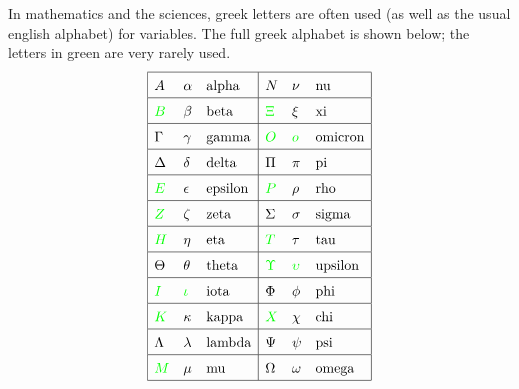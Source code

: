 \documentclass[a4paper]{book}
\newcommand{\GREEN}[1]{{\color{green}#1}}
\renewcommand{\:}{\colon}
\theoremstyle{definition}
\begin{document}
In mathematics and the sciences, greek letters are often used (as well
as the usual english alphabet) for variables.  The full greek alphabet
is shown below; the letters in green are very rarely used.
\[ \renewcommand{\arraystretch}{1.5} \begin{array}{|lll|lll|}
 \hline
 A   & \alpha   & \text{alpha}    &
  N      & \nu      & \text{nu}       \\ \hline
 \GREEN{B}    & \beta    & \text{beta}     &
  \GREEN{\Xi}      & \xi      & \text{xi}       \\ \hline
 \Gamma   & \gamma   & \text{gamma}    &
  \GREEN{O} & \GREEN{o} & \text{omicron}  \\ \hline
 \Delta   & \delta   & \text{delta}    &
  \Pi      & \pi      & \text{pi}       \\ \hline
 \GREEN{E} & \epsilon & \text{epsilon}  &
  \GREEN{P}     & \rho     & \text{rho}      \\ \hline
 \GREEN{Z}    & \zeta    & \text{zeta}     &
  \Sigma   & \sigma   & \text{sigma}    \\ \hline
 \GREEN{H}     & \eta     & \text{eta}      &
  \GREEN{T}     & \tau     & \text{tau}      \\ \hline
 \Theta   & \theta   & \text{theta}    &
  \GREEN{\Upsilon} & \GREEN{\upsilon} & \text{upsilon}  \\ \hline
 \GREEN{I}    & \GREEN{\iota}    & \text{iota}     &
  \Phi     & \phi     & \text{phi}      \\ \hline
 \GREEN{K}   & \kappa   & \text{kappa}    &
  \GREEN{X}     & \chi     & \text{chi}      \\ \hline
 \Lambda  & \lambda  & \text{lambda}   &
  \Psi     & \psi     & \text{psi}      \\ \hline
 \GREEN{M}      & \mu      & \text{mu}       &
  \Omega   & \omega   & \text{omega}    \\ \hline
\end{array} \]
\end{document}
